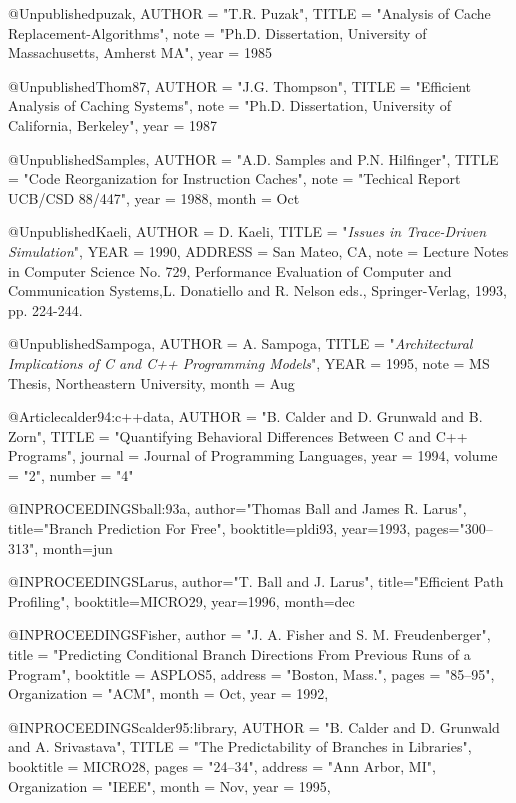@Unpublished{puzak,
        AUTHOR = "T.R. Puzak",
        TITLE = "Analysis of Cache Replacement-Algorithms",
        note = "Ph.D. Dissertation, University of Massachusetts, Amherst MA",
        year =      1985
}


@Unpublished{Thom87,
        AUTHOR = "J.G. Thompson",
        TITLE = "Efficient Analysis of Caching Systems", 
        note = "Ph.D. Dissertation, University of California, Berkeley",
        year =       1987
}

@Unpublished{Samples,
        AUTHOR = "A.D. Samples and P.N. Hilfinger",
        TITLE = "Code Reorganization for Instruction Caches",
        note = "Techical Report UCB/CSD 88/447",
        year =       1988,
	month = Oct
}


@Unpublished{Kaeli,
	AUTHOR = {D. Kaeli},
	TITLE = "{\em Issues in Trace-Driven Simulation}",
	YEAR = {1990},
	ADDRESS = {San Mateo, CA},
	note = { Lecture Notes in Computer Science No. 729, Performance Evaluation of Computer and Communication Systems,L. Donatiello and R. Nelson eds., Springer-Verlag, 1993, pp. 224-244.}
}

@Unpublished{Sampoga,
	AUTHOR = {A. Sampoga},
	TITLE = "{\em Architectural Implications of {C} and {C}++ Programming Models}", 
	YEAR = {1995},
	note = {MS Thesis, Northeastern University},
        month = Aug
}


@Article{calder94:c++data,
        AUTHOR = "B. Calder and D. Grunwald and B. Zorn",
        TITLE = "Quantifying Behavioral Differences Between {C} and {C}++ Programs",
  journal =      {Journal of Programming Languages},
  year =         1994,
  volume =       "2",
  number =       "4"
}


@INPROCEEDINGS{ball:93a,
  author="Thomas Ball and James R. Larus",
  title="Branch Prediction For Free",
  booktitle=pldi93,
  year=1993,
  pages="300--313",
  month=jun
}

@INPROCEEDINGS{Larus,
  author="T. Ball and J. Larus",
  title="Efficient Path Profiling",
  booktitle=MICRO29,
  year=1996,
  month=dec
}

@INPROCEEDINGS{Fisher,
           author = "J. A. Fisher and S. M. Freudenberger",
           title = "Predicting Conditional Branch Directions From Previous Runs of a Program",
           booktitle = ASPLOS5,
           address = "Boston, Mass.",
           pages = "85--95",
           Organization = "ACM",
           month = Oct,
           year = 1992,
}


@INPROCEEDINGS{calder95:library,
        AUTHOR = "B. Calder and D. Grunwald and A. Srivastava",
        TITLE = "The Predictability of Branches in Libraries",
        booktitle = MICRO28,
	pages = "24--34",
        address = "Ann Arbor, MI",
 	Organization = "IEEE",
        month = Nov,
	year = 1995,
}


